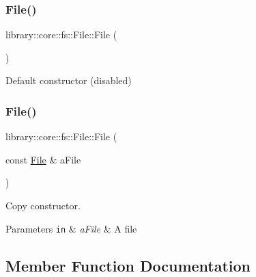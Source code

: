 \subsubsection{\texorpdfstring{File()}{File()}\hspace{0.1cm}{\footnotesize\ttfamily [1/2]}}
{\footnotesize\ttfamily library\+::core\+::fs\+::\+File\+::\+File (\begin{DoxyParamCaption}{ }\end{DoxyParamCaption})\hspace{0.3cm}{\ttfamily [delete]}}



Default constructor (disabled) 

\mbox{\label{classlibrary_1_1core_1_1fs_1_1_file_a6f3f0d79545ac9984c6f49432f0c6c39}} 
\subsubsection{\texorpdfstring{File()}{File()}\hspace{0.1cm}{\footnotesize\ttfamily [2/2]}}
{\footnotesize\ttfamily library\+::core\+::fs\+::\+File\+::\+File (\begin{DoxyParamCaption}\item[{const \hyperlink{classlibrary_1_1core_1_1fs_1_1_file}{File} \&}]{a\+File }\end{DoxyParamCaption})}



Copy constructor. 


\begin{DoxyParams}[1]{Parameters}
\mbox{\tt in}  & {\em a\+File} & A file \\
\hline
\end{DoxyParams}


\subsection{Member Function Documentation}
\mbox{\label{classlibrary_1_1core_1_1fs_1_1_file_a0b95ab08dd8df2cc28b2e42a72ae0b9a}} 
